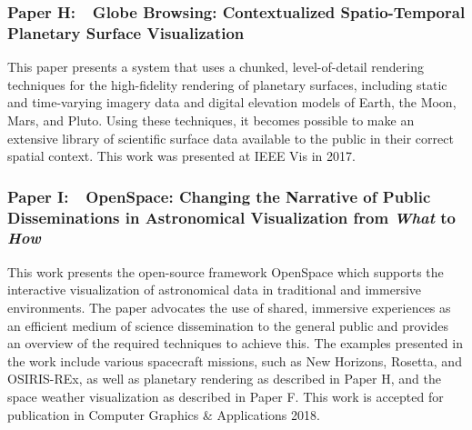 \subsubsection{Paper H:~~Globe Browsing: Contextualized Spatio-Temporal Planetary Surface Visualization}
This paper presents a system that uses a chunked, level-of-detail rendering techniques for the high-fidelity rendering of planetary surfaces, including static and time-varying imagery data and digital elevation models of Earth, the Moon, Mars, and Pluto.  Using these techniques, it becomes possible to make an extensive library of scientific surface data available to the public in their correct spatial context.  This work was presented at IEEE Vis in 2017.

\subsubsection{Paper I:~~OpenSpace: Changing the Narrative of Public Disseminations in Astronomical Visualization from \emph{What} to \emph{How}}
This work presents the open-source framework OpenSpace which supports the interactive visualization of astronomical data in traditional and immersive environments.  The paper advocates the use of shared, immersive experiences as an efficient medium of science dissemination to the general public and provides an overview of the required techniques to achieve this.  The examples presented in the work include various spacecraft missions, such as New Horizons, Rosetta, and OSIRIS-REx, as well as planetary rendering as described in Paper H, and the space weather visualization as described in Paper F.  This work is accepted for publication in Computer Graphics \& Applications 2018.
